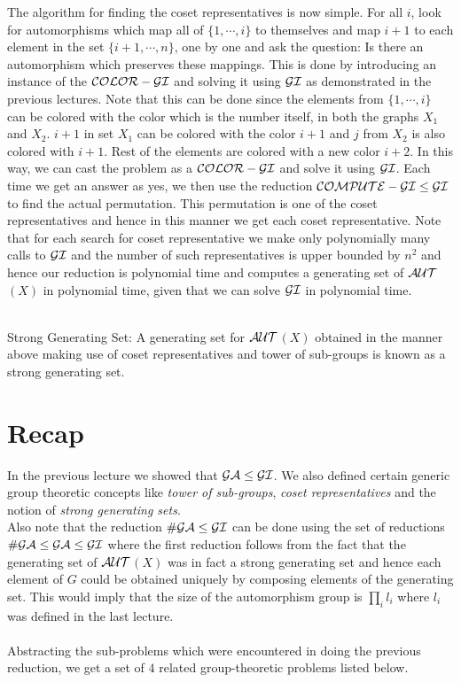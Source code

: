 The algorithm for finding the coset representatives is now simple. For all $i$, look for automorphisms which map all of $\{1, \cdots, i\}$ to themselves and map $i+1$ to each element in the set $\{i+1, \cdots,n\}$, one by one and ask the question: Is there an automorphism which preserves these mappings. This is done by introducing an instance of the $\cal{COLOR-GI}$ and solving it using $\cal{GI}$ as demonstrated in the previous lectures. Note that this can be done since the elements from  $\{1, \cdots, i\}$ 
can be colored with the color which is the number itself, in both the graphs $X_1$ and $X_2$. $i+1$ in set $X_1$ can be colored with the color $i+1$ and $j$ from $X_2$ is also colored with $i+1$. Rest of the elements are colored with a new color $i+2$. In this way, we can cast the problem as a $\cal{COLOR-GI}$ and solve it using $\cal{GI}$. Each time we get an answer as yes, we then use the reduction $\cal{COMPUTE-GI} \le \cal{GI}$ to find the actual permutation. This permutation is one of the coset representatives and hence in this manner we get each coset representative. Note that for each search for coset representative we make only polynomially many calls to $\cal{GI}$ and the number of such representatives is upper bounded by $n^2$ and hence our reduction is polynomial time and computes a generating set of $\cal{AUT}$$(X)$ in polynomial time, given that we can solve $\cal{GI}$ in polynomial time.\\\\
\begin{definition}
	Strong Generating Set: A generating set for $\cal{AUT}$$(X)$ obtained in the manner above making use of coset representatives and tower of sub-groups is known as a strong generating set.
\end{definition}




\section {Recap}
In the previous lecture we showed that $\cal{GA} \le \cal{GI}$. We also defined certain generic group theoretic concepts like {\it tower of sub-groups}, {\it coset representatives} and the notion of {\it strong generating sets}.
\\ Also note that the reduction $\cal{\#GA} \le \cal{GI}$ can be done using the set of reductions ${\cal{\#GA} \le \cal{GA} \le \cal{GI}}$ where the
first reduction follows from the fact that the generating set of $\cal{AUT}$$(X)$ was in fact a strong generating set and hence each element of $G$
could be obtained uniquely by composing elements of the generating set. This would imply that the size of the automorphism group is $\displaystyle
\prod_{i} l_{i}$ where $l_i$ was defined in the last lecture.\\\\ Abstracting the sub-problems which were encountered in doing the previous
reduction, we get a set of $4$ related group-theoretic problems listed below.
